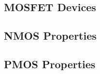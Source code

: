 \documentclass[a4paper, 12pt]{report}
\begin{document}
\begin{center}
\chapter{MOSFET Devices}
\begin{comment}
\end{comment}
\section{NMOS Properties}
\begin{comment}
\end{comment}
\section{PMOS Properties}
\begin{comment}
\end{comment}
\end{center}
\end{document}
